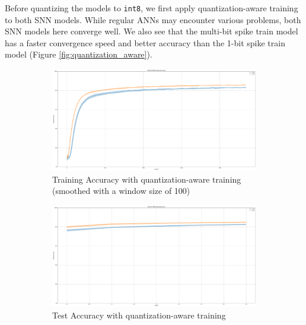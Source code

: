         Before quantizing the models to \verb|int8|, we first apply quantization-aware training to both SNN models. While regular ANNs may encounter various problems, both SNN models here converge well. We also see that the multi-bit spike train model has a faster convergence speed and better accuracy than the 1-bit spike train model (Figure \ref{fig:quantization_aware}). 
        \begin{figure}[!htpb]
            \centering
            \begin{subfigure}[H]{0.48\textwidth}
                \centering
                \includegraphics[width=\textwidth]{../quantized/FashionMNIST/plots/fashionmnist_train_acc.pdf}
                \caption{Training Accuracy with quantization-aware training (smoothed with a window size of 100)}
            \end{subfigure}
            \hfill
            \begin{subfigure}[H]{0.48\textwidth}
                \centering
                \includegraphics[width=\textwidth]{../quantized/FashionMNIST/plots/fashionmnist_test_acc.pdf}
                \caption{Test Accuracy with quantization-aware training}
            \end{subfigure}
            \hfill
            \begin{subfigure}[H]{\textwidth}

\end{subfigure}
\end{figure}
